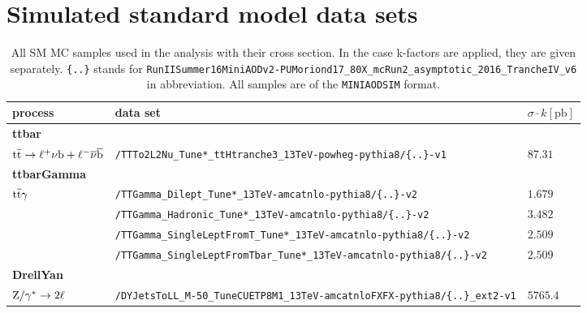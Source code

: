 \section*{Simulated standard model data sets}
\begin{table}[tb]
 \centering
 \caption{All SM MC samples used in the analysis with their cross section. In the case k-factors are applied, they are given separately. \texttt{\{..\}} stands for \texttt{RunIISummer16MiniAODv2-PUMoriond17\_80X\_mcRun2\_asymptotic\_2016\_TrancheIV\_v6} in abbreviation. All samples are of the \texttt{MINIAODSIM} format.}
 \scriptsize
 \label{tab:app_MCsets}
 \begin{tabular}[width=\textwidth]{lll}
  \hline
  \normalsize{process}                             & \normalsize{data set}   & \normalsize{$\sigma\cdot k[\mathrm{pb}]$} \\\hline
  \scriptsize{\textbf{ttbar}}                      &                         &                                           \\
  ${\mathrm{t}\overline{\mathrm{t}}}\to\ell^{+}\nu\mathrm{b}+\ell^{-}\overline{\nu}\overline{\mathrm{b}}$ & \verb|/TTTo2L2Nu_Tune*_ttHtranche3_13TeV-powheg-pythia8/{..}-v1|  & $87.31$                                   \\
  \scriptsize{\textbf{ttbarGamma}}                 &                         &                                           \\
  ${\mathrm{t}\overline{\mathrm{t}}}\gamma$                                     & \verb|/TTGamma_Dilept_Tune*_13TeV-amcatnlo-pythia8/{..}-v2|  & $1.679$                                   \\
                                                   & \verb|/TTGamma_Hadronic_Tune*_13TeV-amcatnlo-pythia8/{..}-v2|  & $3.482$                                   \\
                                                   & \verb|/TTGamma_SingleLeptFromT_Tune*_13TeV-amcatnlo-pythia8/{..}-v2|  & $2.509$                                   \\
                                                   & \verb|/TTGamma_SingleLeptFromTbar_Tune*_13TeV-amcatnlo-pythia8/{..}-v2|  & $2.509$                                   \\
  \scriptsize{\textbf{DrellYan}}                   &                         &                                           \\
  $\mathrm{Z}/\gamma^{*}\to2\ell$                           & \verb|/DYJetsToLL_M-50_TuneCUETP8M1_13TeV-amcatnloFXFX-pythia8/{..}_ext2-v1| & $5765.4$                                  \\

\end{tabular}
\end{table}

